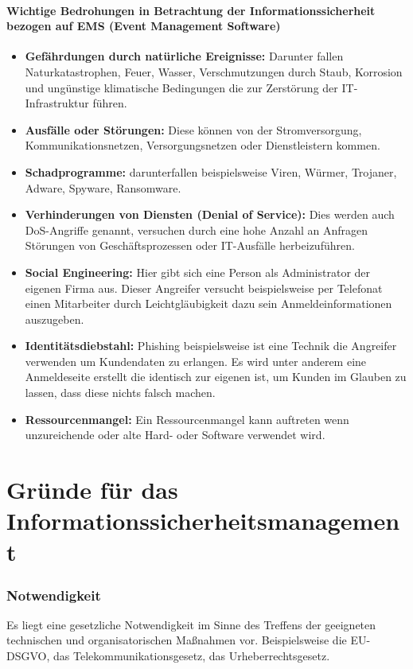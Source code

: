 \paragraph{Wichtige Bedrohungen in Betrachtung der Informationssicherheit bezogen auf EMS (Event Management Software)}
\begin{itemize}
	\item \textbf{Gefährdungen durch natürliche Ereignisse:} Darunter fallen Naturkatastrophen, Feuer, Wasser, Verschmutzungen durch Staub, Korrosion und ungünstige klimatische Bedingungen die zur Zerstörung der IT-Infrastruktur führen.
	\item \textbf{Ausfälle oder Störungen:} Diese können von der Stromversorgung, Kommunikationsnetzen, Versorgungsnetzen oder Dienstleistern kommen.
	\item \textbf{Schadprogramme:} darunterfallen beispielsweise Viren, Würmer, Trojaner, Adware, Spyware, Ransomware.
	\item \textbf{Verhinderungen von Diensten (Denial of Service):} Dies werden auch DoS-Angriffe genannt, versuchen durch eine hohe Anzahl an Anfragen Störungen von Geschäftsprozessen oder IT-Ausfälle herbeizuführen.
	\item \textbf{Social Engineering:} Hier gibt sich eine Person als Administrator der eigenen Firma aus. Dieser Angreifer versucht beispielsweise per Telefonat einen Mitarbeiter durch Leichtgläubigkeit dazu  sein Anmeldeinformationen auszugeben.
	\item \textbf{Identitätsdiebstahl:} Phishing beispielsweise ist eine Technik die Angreifer verwenden um Kundendaten zu erlangen. Es wird unter anderem eine Anmeldeseite erstellt die identisch zur eigenen ist, um Kunden im Glauben zu lassen, dass diese nichts falsch machen.
	\item \textbf{Ressourcenmangel:} Ein Ressourcenmangel kann auftreten wenn unzureichende oder alte Hard- oder Software verwendet wird. 
\end{itemize}

\section{Gründe für das Informationssicherheitsmanagement}
\subsubsection{Notwendigkeit}
Es liegt eine gesetzliche Notwendigkeit im Sinne des Treffens der geeigneten technischen und organisatorischen Maßnahmen vor. Beispielsweise die EU-DSGVO, das Telekommunikationsgesetz, das Urheberrechtsgesetz.

